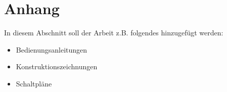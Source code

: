 \chapter*{Anhang}
\label{cha:Anhang}

In diesem Abschnitt soll der Arbeit z.B. folgendes hinzugef\"ugt werden:

\begin{itemize}
    \item Bedienungsanleitungen
    \item Konstruktionszeichnungen
    \item Schaltpl\"ane
\end{itemize}
